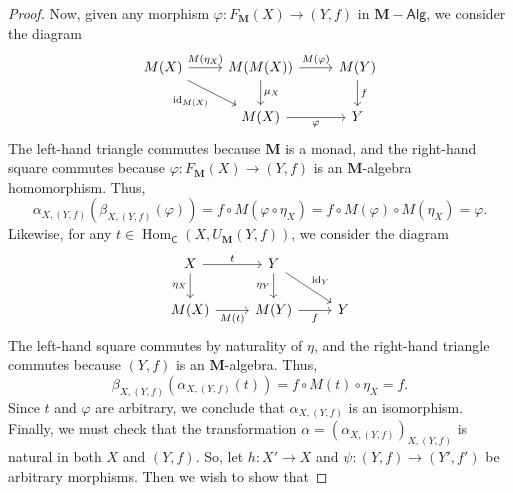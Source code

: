 \documentclass{article}
\theoremstyle{definition}
\newcommand{\C}{\mathsf{C}}
\DeclareMathOperator{\id}{id}
\newcommand{\Alg}{\mathsf{Alg}}
\DeclareMathOperator{\Hom}{Hom}
\begin{document}
\begin{proof}
    Now, given any morphism $\varphi : F_{\mathbf{M}}(X) \to (Y,f)$ in $\mathbf{M}{-}\Alg$, we consider the diagram
    \[\begin{tikzcd}[ampersand replacement=\&]
    	{M(X)} \& {M(M(X))} \& {M(Y)} \\
    	\& {M(X)} \& Y
    	\arrow["{M(\eta_X)}", from=1-1, to=1-2]
    	\arrow["{M(\varphi)}", from=1-2, to=1-3]
    	\arrow["f", from=1-3, to=2-3]
    	\arrow["{\mu_X}", from=1-2, to=2-2]
    	\arrow["{\id_{M(X)}}"', from=1-1, to=2-2]
    	\arrow["\varphi"', from=2-2, to=2-3]
    \end{tikzcd}\]
    The left-hand triangle commutes because $\mathbf{M}$ is a monad, and the right-hand square commutes because $\varphi : F_{\mathbf{M}}(X) \to (Y,f)$ is an $\mathbf{M}$-algebra homomorphism. Thus,
    \[\alpha_{X,(Y,f)}(\beta_{X,(Y,f)}(\varphi)) = f \circ M(\varphi \circ \eta_X) = f \circ M(\varphi) \circ M(\eta_X) = \varphi.\]
    Likewise, for any $t \in \Hom_{\C}(X,U_{\mathbf{M}}(Y,f))$, we consider the diagram
    \[\begin{tikzcd}[ampersand replacement=\&]
    	X \& Y \\
    	{M(X)} \& {M(Y)} \& Y
    	\arrow["t", from=1-1, to=1-2]
    	\arrow["{\id_Y}", from=1-2, to=2-3]
    	\arrow["{\eta_X}"', from=1-1, to=2-1]
    	\arrow["{M(t)}"', from=2-1, to=2-2]
    	\arrow["{\eta_Y}"', from=1-2, to=2-2]
    	\arrow["f"', from=2-2, to=2-3]
    \end{tikzcd}\]
    The left-hand square commutes by naturality of $\eta$, and the right-hand triangle commutes because $(Y,f)$ is an $\mathbf{M}$-algebra. Thus,
    \[\beta_{X,(Y,f)}(\alpha_{X,(Y,f)}(t)) = f \circ M(t) \circ \eta_X = f.\]
    Since $t$ and $\varphi$ are arbitrary, we conclude that $\alpha_{X,(Y,f)}$ is an isomorphism. Finally, we must check that the transformation $\alpha = (\alpha_{X,(Y,f)})_{X,(Y,f)}$ is natural in both $X$ and $(Y,f)$. So, let $h : X' \to X$ and $\psi : (Y,f) \to (Y',f')$ be arbitrary morphisms. Then we wish to show that

\end{proof}
\end{document}
